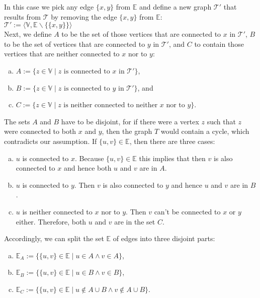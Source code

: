 \begin{enumerate}
  In this case we pick any edge $\{x,y\}$ from $\mathbb{E}$ and define a new graph $\mathcal{T}'$ that results from $\mathcal{T}$
  by removing the edge $\{x,y\}$ from $\mathbb{E}$:
  \\[0.2cm]
  \hspace*{1.3cm}
  $\mathcal{T}' := \bigl\langle \mathbb{V}, \mathbb{E} \backslash \bigl\{ \{x,y\} \bigr\} \bigr\rangle$ 
  \\[0.2cm]
  Next, we define $A$ to be the set of those vertices that are connected to $x$ in $\mathcal{T}'$, $B$ to be the set
  of vertices that are connected to $y$ in $\mathcal{T}'$, and $C$ to contain those vertices that are neither connected to
  $x$ nor to $y$:
  \begin{enumerate}[(a)]
  \item $A := \{ z \in \mathbb{V} \mid \mbox{$z$ is connected to $x$ in $\mathcal{T}'$}\}$, \quad 
  \item $B := \{ z \in \mathbb{V} \mid \mbox{$z$ is connected to $y$ in $\mathcal{T}'$}\}$, \quad and \quad
  \item $C := \{ z \in \mathbb{V} \mid \mbox{$z$ is neither connected to neither $x$ nor to $y$}\}$.
  \end{enumerate}
  The sets $A$ and $B$ have to be disjoint, for if there were a vertex $z$ such that $z$ were connected to both
  $x$ and $y$, then the graph $T$ would contain a cycle, which contradicts our assumption.
  If $\{u,v\}\in\mathbb{E}$, then there are three cases:
  \begin{enumerate}[(a)]
  \item $u$ is connected to $x$.  Because $\{u,v\}\in\mathbb{E}$ this implies that then $v$ is also connected
        to $x$ and hence both $u$ and $v$ are in $A$.
  \item $u$ is connected to $y$.  Then $v$ is also connected to $y$ and hence $u$ and $v$ are in $B$.
  \item $u$ is neither connected to $x$ nor to $y$.  Then $v$ can't be connected to $x$ or $y$ either.
        Therefore, both $u$ and $v$ are in the set $C$.
  \end{enumerate}
  Accordingly, we can split the set $\mathbb{E}$ of edges into three disjoint parts:
  \begin{enumerate}[(a)]
  \item $\mathbb{E}_A := \bigl\{ \{u,v\}\in\mathbb{E} \mid u\in A \wedge v\in A \bigr\}$,
  \item $\mathbb{E}_B := \bigl\{ \{u,v\}\in\mathbb{E} \mid u\in B \wedge v\in B \bigr\}$,
  \item $\mathbb{E}_C := \bigl\{ \{u,v\}\in\mathbb{E} \mid u\not\in A \cup B \wedge v\not\in A \cup B \bigr\}$.

\end{enumerate}
\end{enumerate}
